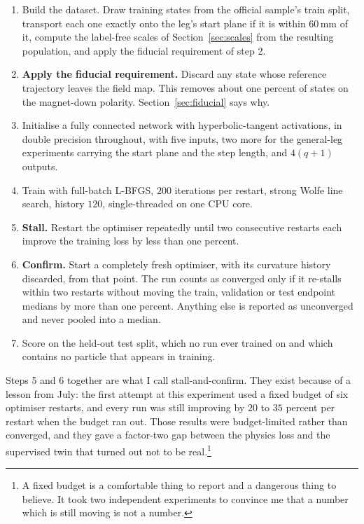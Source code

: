 \documentclass[11pt,a4paper]{article}
\newcommand{\mm}{\ensuremath{\,\mathrm{mm}}}
\begin{document}
\begin{enumerate}
  \item Build the dataset. Draw training states from the official sample's train
  split, transport each one exactly onto the leg's start plane if it is within
  $60\mm$ of it, compute the label-free scales of
  Section~\ref{sec:scales} from the resulting population, and apply the fiducial
  requirement of step 2.
  \item \textbf{Apply the fiducial requirement.} Discard any state whose
  reference trajectory leaves the field map. This removes about one percent of
  states on the magnet-down polarity. Section~\ref{sec:fiducial} says why.
  \item Initialise a fully connected network with hyperbolic-tangent
  activations, in double precision throughout, with five inputs, two more for
  the general-leg experiments carrying the start plane and the step length, and
  $4(q+1)$ outputs.
  \item Train with full-batch L-BFGS, $200$ iterations per restart, strong Wolfe
  line search, history $120$, single-threaded on one CPU core.
  \item \textbf{Stall.} Restart the optimiser repeatedly until two consecutive
  restarts each improve the training loss by less than one percent.
  \item \textbf{Confirm.} Start a completely fresh optimiser, with its curvature
  history discarded, from that point. The run counts as converged only if it
  re-stalls within two restarts without moving the train, validation or test
  endpoint medians by more than one percent. Anything else is reported as
  unconverged and never pooled into a median.
  \item Score on the held-out test split, which no run ever trained on and which
  contains no particle that appears in training.
\end{enumerate}

Steps 5 and 6 together are what I call stall-and-confirm. They exist because of
a lesson from July: the first attempt at this experiment used a fixed budget of
six optimiser restarts, and every run was still improving by $20$ to $35$
percent per restart when the budget ran out. Those results were budget-limited
rather than converged, and they gave a factor-two gap between the physics loss
and the supervised twin that turned out not to be real.\footnote{A fixed budget
is a comfortable thing to report and a dangerous thing to believe. It took two
independent experiments to convince me that a number which is still moving is
not a number.}
\end{document}
